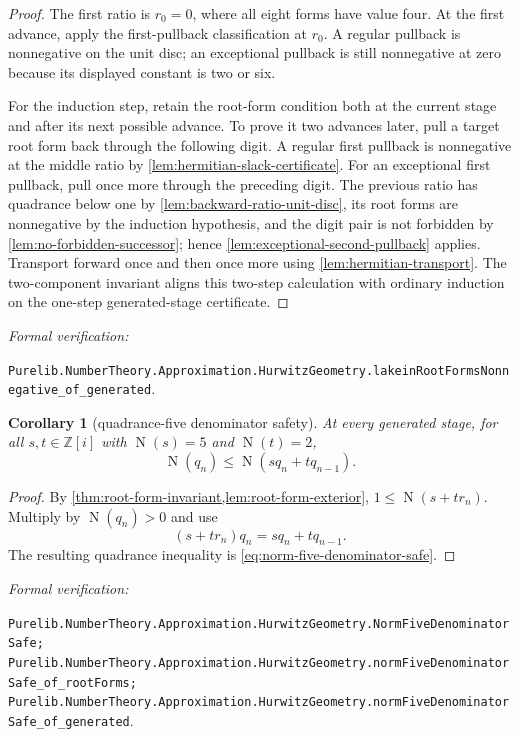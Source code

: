 \documentclass[11pt]{article}
\newtheorem{corollary}[corollary]{Corollary}
\newcommand{\Zi}{\mathbb{Z}[i]}
\newcommand{\Norm}[1]{\operatorname{N}\!\left(#1\right)}
\newcommand{\leanref}[1]{\par\smallskip\noindent
  \emph{Formal verification:}\par\nobreak
  {\raggedright\nolinkurl{#1}.\par}}
\begin{document}
\begin{proof}
The first ratio is $r_0=0$, where all eight forms have value four.  At the
first advance, apply the first-pullback classification at $r_0$.  A regular
pullback is nonnegative on the unit disc; an exceptional pullback is still
nonnegative at zero because its displayed constant is two or six.

For the induction step, retain the root-form condition both at the current
stage and after its next possible advance.  To prove it two advances later,
pull a target root form back through the following digit.  A regular first
pullback is nonnegative at the middle ratio by
\cref{lem:hermitian-slack-certificate}.  For an exceptional first pullback,
pull once more through the preceding digit.  The previous ratio has
quadrance below one by \cref{lem:backward-ratio-unit-disc}, its root forms are
nonnegative by the induction hypothesis, and the digit pair is not forbidden
by \cref{lem:no-forbidden-successor}; hence
\cref{lem:exceptional-second-pullback} applies.  Transport forward once and
then once more using \cref{lem:hermitian-transport}.  The two-component
invariant aligns this two-step calculation with ordinary induction on the
one-step generated-stage certificate.
\end{proof}

\leanref{Purelib.NumberTheory.Approximation.HurwitzGeometry.lakeinRootFormsNonnegative_of_generated}

\begin{corollary}[quadrance-five denominator safety]
\label{cor:norm-five-denominator-safe}
At every generated stage, for all $s,t\in\Zi$ with
$\Norm s=5$ and $\Norm t=2$,
\begin{equation}
\label{eq:norm-five-denominator-safe}
        \Norm{q_n}\le\Norm{s q_n+t q_{n-1}}.
\end{equation}
\end{corollary}

\begin{proof}
By \cref{thm:root-form-invariant,lem:root-form-exterior},
$1\le\Norm{s+t r_n}$.  Multiply by $\Norm{q_n}>0$ and use
\[
                    (s+t r_n)q_n=sq_n+tq_{n-1}.
\]
The resulting quadrance inequality is
\eqref{eq:norm-five-denominator-safe}.
\end{proof}

\leanref{Purelib.NumberTheory.Approximation.HurwitzGeometry.NormFiveDenominatorSafe;
Purelib.NumberTheory.Approximation.HurwitzGeometry.normFiveDenominatorSafe_of_rootForms;
Purelib.NumberTheory.Approximation.HurwitzGeometry.normFiveDenominatorSafe_of_generated}
\end{document}
